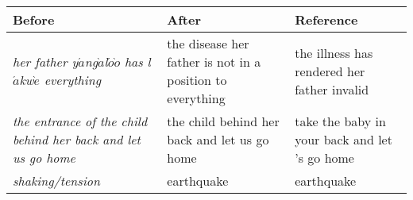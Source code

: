 \begin{tabular}{p{}p{}p{}}
\toprule
Before & After & Reference \\ 
\toprule
\emph{her father y$\acute{a}$ng$\grave{a}$l$\acute{o}$$\grave{o}$ has l$\acute{a}$kw$\grave{e}$ everything} & the disease her father is not in a position to everything & the illness has rendered her father invalid \\
\midrule
\emph{the entrance of the child behind her back and let us go home} & the child behind her back and let us go home & take the baby in your back and let 's go home \\
\midrule
\emph{shaking/tension} & earthquake & earthquake \\
\bottomrule
\end{tabular} 